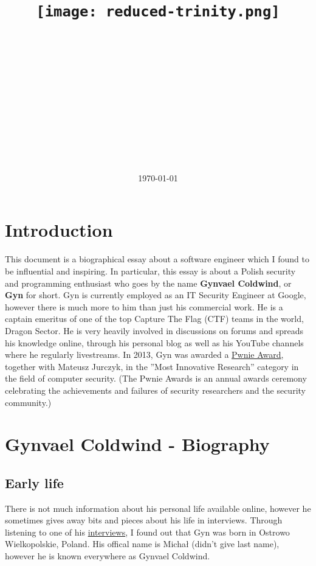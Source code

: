 \documentclass[11pt]{article}
\title{
\vspace{-1in}
\begin{figure}[!ht]
\flushleft
\texttt{[image: reduced-trinity.png]}
\end{figure}
\vspace{-0.5cm}
\hrulefill \\
\vspace{0.5cm}
\textmd{\textbf{\moduleCode\ \moduleName}}\\
\textmd{\textbf{\assignmentTitle}}\\
\hrulefill \\
}
\author{\textbf{\authorName} \\ \textbf{\authorID}}
\date{\today}
\begin{document}
\lstset{language=Java, captionpos=b, frame=single}
\captionsetup{width=.8\linewidth} 

\maketitle
\tableofcontents
\vspace{0.5in}

\section{Introduction}
\label{sec:Intro}

This document is a biographical essay about a software engineer which I found to be influential and inspiring. In particular, this essay is about a Polish security and programming enthusiast who goes by the name \textbf{Gynvael Coldwind}, or \textbf{Gyn} for short. Gyn is currently employed as an IT Security Engineer at Google, however there is much more to him than just his commercial work. He is a captain emeritus of one of the top Capture The Flag (CTF) teams in the world, Dragon Sector. He is very heavily involved in discussions on forums and spreads his knowledge online, through his personal blog as well as his YouTube channels where he regularly livestreams. In 2013, Gyn was awarded a  \href{https://pwnies.com/previous/2013/most-innovative-research/}{Pwnie Award}, together with Mateusz Jurczyk, in the ”Most Innovative Research” category in the field of computer security. (The Pwnie Awards is an annual awards ceremony celebrating the achievements and failures of security researchers and the security community.)
 
\section{Gynvael Coldwind - Biography}
\subsection{Early life}
There is not much information about his personal life available online, however he sometimes gives away bits and pieces about his life in interviews. Through listening to one of his \href{https://www.youtube.com/watch?v=hxubg2C1kXQ}{interviews}, I found out that Gyn was born in Ostrowo Wielkopolskie, Poland. His offical name is Michał (didn't give last name), however he is known everywhere as Gynvael Coldwind. \\
\end{document}
